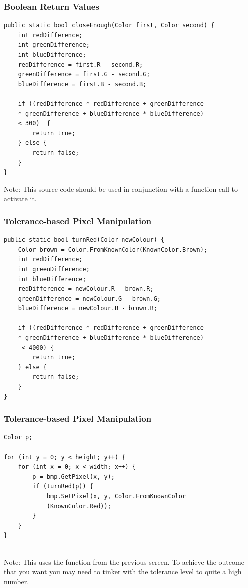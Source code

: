 \begin{frame}[fragile]
	\frametitle{Boolean Return Values}
	
\begin{lstlisting}
public static bool closeEnough(Color first, Color second) {
	int redDifference;
	int greenDifference;
	int blueDifference;
	redDifference = first.R - second.R;
	greenDifference = first.G - second.G;
	blueDifference = first.B - second.B;
	
	if ((redDifference * redDifference + greenDifference
	* greenDifference + blueDifference * blueDifference)
	< 300)	{
		return true;
	} else {
		return false;
	}
}
\end{lstlisting}

Note: This source code should be used in conjunction with a function call to activate it.

\end{frame}

\begin{frame}[fragile]
	\frametitle{Tolerance-based Pixel Manipulation}
	
\begin{lstlisting}
public static bool turnRed(Color newColour) {
	Color brown = Color.FromKnownColor(KnownColor.Brown);
	int redDifference;
	int greenDifference;
	int blueDifference;
	redDifference = newColour.R - brown.R;
	greenDifference = newColour.G - brown.G;
	blueDifference = newColour.B - brown.B;
	
	if ((redDifference * redDifference + greenDifference
	* greenDifference + blueDifference * blueDifference)
	 < 4000) {
		return true;
	} else {
		return false;
	}	
}

\end{lstlisting}


\end{frame}

\begin{frame}[fragile]
	\frametitle{Tolerance-based Pixel Manipulation}
	
	\begin{lstlisting}
Color p;

for (int y = 0; y < height; y++) {
	for (int x = 0; x < width; x++) {
		p = bmp.GetPixel(x, y);
		if (turnRed(p))	{
			bmp.SetPixel(x, y, Color.FromKnownColor
			(KnownColor.Red));
		}
	}
}
		
	\end{lstlisting}
Note: This uses the function from the previous screen. To achieve the outcome that you want you may need to tinker with the tolerance level to quite a high number.	
	
\end{frame}
		

